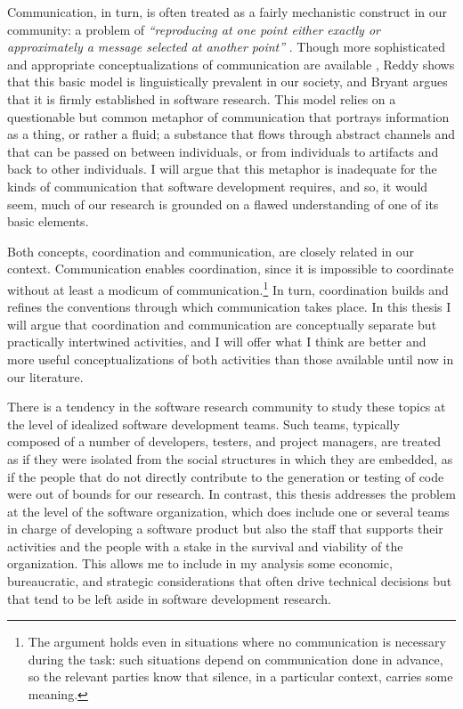 Communication, in turn, is often treated as a fairly mechanistic construct in our community: a problem of \emph{``reproducing at one point either exactly or approximately a message selected at another point''} \cite{Shannon1948}. Though more sophisticated and appropriate conceptualizations of communication are available \cite{Littlejohn2002}, Reddy  shows that this basic model is linguistically prevalent in our society, and Bryant  argues that it is firmly established in software research. This model relies on a questionable but common metaphor of communication that portrays information as a thing, or rather a fluid; a substance that flows through abstract channels and that can be passed on between individuals, or from individuals to artifacts and back to other individuals. I will argue that this metaphor is inadequate for the kinds of communication that software development requires, and so, it would seem, much of our research is grounded on a flawed understanding of one of its basic elements.

Both concepts, coordination and communication, are closely related in our context. Communication enables coordination, since it is impossible to coordinate without at least a modicum of communication.\footnote{The argument holds even in situations where no communication is necessary during the task: such situations depend on communication done in advance, so the relevant parties know that silence, in a particular context, carries some meaning.} In turn, coordination builds and refines the conventions through which communication takes place. In this thesis I will argue that coordination and communication are conceptually separate but practically intertwined activities, and I will offer what I think are better and more useful conceptualizations of both activities than those available until now in our literature.

There is a tendency in the software research community to study these topics at the level of idealized software development teams. Such teams, typically composed of a number of developers, testers, and project managers, are treated as if they were isolated from the social structures in which they are embedded, as if the people that do not directly contribute to the generation or testing of code were out of bounds for our research. In contrast, this thesis addresses the problem at the level of the software organization, which does include one or several teams in charge of developing a software product but also the staff that supports their activities and the people with a stake in the survival and viability of the organization. This allows me to include in my analysis some economic, bureaucratic, and strategic considerations that often drive technical decisions but that tend to be left aside in software development research.

